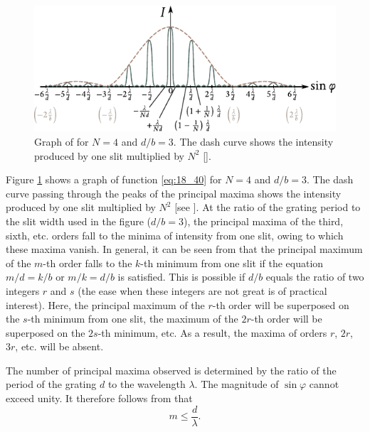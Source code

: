 \begin{figure}[t]
	\begin{center}
		\includegraphics[scale=1.1]{figures/ch_18/fig_18_34.pdf}
        \caption[]{Graph of  for $N=4$ and $d/b=3$. The dash curve shows the intensity produced by one slit multiplied by $N^2$ [].}
		\label{fig:18_34}
	\end{center}
	\vspace{-0.8cm}
\end{figure}

Figure \ref{fig:18_34} shows a graph of function \eqref{eq:18_40} for $N=4$ and $d/b=3$.
The dash curve passing through the peaks of the principal maxima shows the intensity produced by one slit multiplied by $N^2$ [see ].
At the ratio of the grating period to the slit width used in the figure ($d/b=3$), the principal maxima of the third, sixth, etc. orders fall to the minima of intensity from one slit, owing to which these maxima vanish.
In general, it can be seen from  that the principal maximum of the $m$-th order falls to the $k$-th minimum from one slit if the equation $m/d = k/b$ or $m/k = d/b$ is satisfied.
This is possible if $d/b$ equals the ratio of two integers $r$ and $s$ (the ease when these integers are not great is of practical interest).
Here, the principal maximum of the $r$-th order will be superposed on the $s$-th minimum from one slit, the maximum of the $2r$-th order will be superposed on the $2s$-th minimum, etc.
As a result, the maxima of orders $r$, $2r$, $3r$, etc. will be absent.

The number of principal maxima observed is determined by the ratio of the period of the grating $d$ to the wavelength $\lambda$.
The magnitude of $\sin\varphi$ cannot exceed unity.
It therefore follows from  that
\begin{equation}\label{eq:18_45}
	m \leqslant \frac{d}{\lambda}.
\end{equation}

